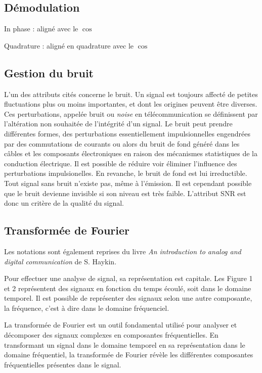 \subsection{Démodulation}

In phase : aligné avec le $\cos$

Quadrature : aligné en quadrature avec le $\cos$


\subsection{Gestion du bruit}

L'un des attributs cités concerne le bruit. Un signal est toujours affecté de petites fluctuations plus ou moins importantes, et dont les origines peuvent être diverses. Ces perturbations, appelée bruit ou \textit{noise} en télécommunication se définissent par l'altération non souhaitée de l'intégrité d'un signal. Le bruit peut prendre différentes formes, des perturbations essentiellement impulsionnelles engendrées par des commutations de courants ou alors du bruit de fond généré dans les câbles et les composants électroniques en raison
des mécanismes statistiques de la conduction électrique. Il est possible de réduire voir éliminer l'influence des perturbations impulsionelles. En revanche, le bruit de fond est lui irreductible. Tout signal sans bruit n'existe pas, même à l'émission. Il est cependant possible que le bruit devienne invisible si son niveau est très faible. L'attribut SNR est donc un critère de la qualité du signal.


\subsection{Transformée de Fourier}

Les notations sont également reprises du livre \textit{An introduction to analog and digital communication} de S. Haykin\cite{book1}.

\vspace{0.1cm}

Pour effectuer une analyse de signal, sa représentation est capitale. Les Figure 1 et 2 représentent des signaux en fonction du temps écoulé, soit dans le domaine temporel. Il est possible de représenter des signaux selon une autre composante, la fréquence, c'est à dire dans le domaine fréquenciel.

\vspace{0.1cm}

La transformée de Fourier est un outil fondamental utilisé pour analyser et décomposer des signaux complexes en composantes fréquentielles. En transformant un signal dans le domaine temporel en sa représentation dans le domaine fréquentiel, la transformée de Fourier révèle les différentes composantes fréquentielles présentes dans le signal.

